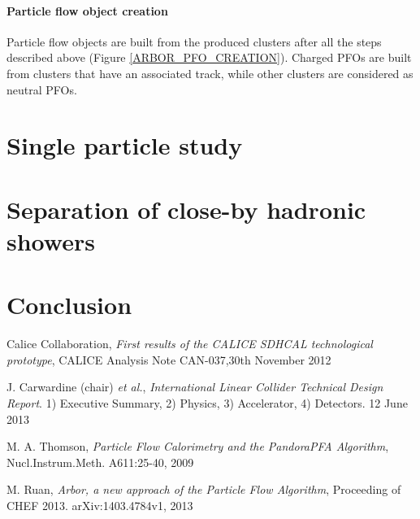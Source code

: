 \documentclass[cits]{JINST}
\begin{document}
\paragraph*{Particle flow object creation} Particle flow objects are built from the produced clusters after all the steps described above (Figure \ref{ARBOR_PFO_CREATION}). Charged PFOs are built from clusters that have an associated track, while other clusters are considered as neutral PFOs.

\section{Single particle study}





\section{Separation of close-by hadronic showers}


\section{Conclusion} 


\begin{thebibliography}{6}
\renewcommand{\hepex}[1]{\href{http://www.arxiv.org/abs/#1}{\tt hep-ex/#1}}
\renewcommand{\physics}[1]{\href{http://www.arxiv.org/abs/#1}{\tt phys.int-det/#1}}
\newcommand\nim[4]{\href{http://dx.doi.org/10.1016/#4}
  {\emph{Nucl.\ Instrum.\ Meth.} {\bf #1} (#2) #3}}


Calice Collaboration, \emph{First results of the CALICE SDHCAL technological prototype}, CALICE Analysis Note CAN-037,30th November 2012

J. Carwardine (chair) {\it et al.},  \emph{International Linear Collider Technical Design Report}. 1) Executive Summary, 2) Physics, 3) Accelerator, 4) Detectors. 12 June 2013

M. A. Thomson, \emph{Particle Flow Calorimetry and the PandoraPFA Algorithm}, Nucl.Instrum.Meth. A611:25-40, 2009

M. Ruan, \emph{Arbor, a new approach of the Particle Flow Algorithm}, Proceeding of CHEF 2013. arXiv:1403.4784v1, 2013

\newpage

\end{thebibliography}
\end{document}
